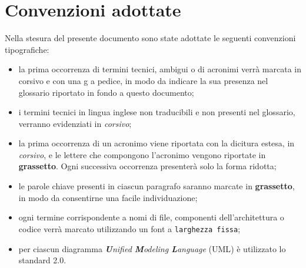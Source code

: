 \section{Convenzioni adottate}
Nella stesura del presente documento sono state adottate le seguenti convenzioni
tipografiche:
\begin{itemize}
	\item la prima occorrenza di termini tecnici, ambigui o di acronimi verrà marcata in corsivo	e con una g a pedice, in modo da indicare la sua presenza nel glossario riportato in fondo a questo documento;
	\item i termini tecnici in lingua inglese non traducibili e non presenti nel glossario, verranno evidenziati in \emph{corsivo};
	\item la prima occorrenza di un acronimo viene riportata con la dicitura estesa, in
	\emph{corsivo}, e le lettere che compongono l’acronimo vengono riportate in \textbf{grassetto}. Ogni successiva occorrenza presenterà solo la forma ridotta;
	\item le parole chiave presenti in ciascun paragrafo saranno marcate in \textbf{grassetto}, in modo da consentirne una facile individuazione;
	\item ogni termine corrispondente a nomi di file, componenti dell’architettura o codice verrà marcato utilizzando un font a \texttt{larghezza fissa};
	\item per ciascun diagramma \emph{\textbf{U}nified \textbf{M}odeling \textbf{L}anguage} (\acrshort{UML}) è utilizzato lo standard 2.0.
\end{itemize}
